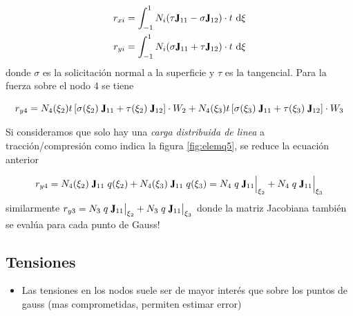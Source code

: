\begin{align}
r_{xi}&=\int^1_{-1}N_i (\tau \jac_{11}- \sigma \jac_{12})\cdot t~\di \xi \\
r_{yi}&=\int^1_{-1}N_i (\sigma \jac_{11}+\tau \jac_{12})\cdot t~ \di \xi 
\end{align}
donde $\sigma$ es la solicitación normal a la superficie y $\tau$ es la tangencial. Para la fuerza sobre el nodo 4 se tiene

$$r_{y4}= N_4(\xi_2)t\left[\sigma(\xi_2)\; \jac_{11}+\tau(\xi_2)\; \jac_{12}\right] \cdot W_2 + N_4(\xi_3)t\left[\sigma(\xi_3)\; \jac_{11}+\tau(\xi_3)\; \jac_{12}\right]\cdot W_3 $$

Si consideramos que solo hay una \emph{carga distribuida de linea} a tracción/compresión como indica la figura \ref{fig:elemq5}, se reduce la ecuación anterior

$$ r_{y4} = N_4(\xi_2)\;\jac_{11}\;q(\xi_2) + N_4(\xi_3)\;\jac_{11}\;q(\xi_3) =N_4\;q \;\jac_{11}\Big|_{\xi_2} + N_4\;q\; \jac_{11}\Big|_{\xi_3} $$
similarmente $r_{y3} = N_3\;q \;\jac_{11}\big|_{\xi_2} + N_3\;q\; \jac_{11}\big|_{\xi_3} $ donde la matriz Jacobiana también se evalúa para cada punto de Gauss!


\subsection*{Tensiones}
\begin{itemize}
	\item Las tensiones en los nodos suele ser de mayor interés que sobre los puntos de gauss (mas comprometidas, permiten estimar error)
\end{itemize}

